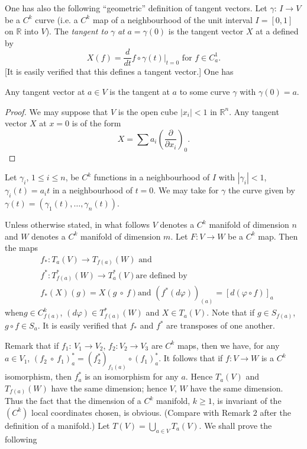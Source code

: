 One has also the following ``geometric'' definition of tangent
vectors. Let $\gamma$: $I \to V$ be a $C^k$ curve (i.e. a $C^k$ map of
a neighbourhood of the unit interval $I = [ 0, 1]$ on $\mathbb{R} $
into $V$). The \textit{tangent to} $\gamma$ \textit{at} $a = \gamma
(0)$ is the tangent vector $X$ at a defined by  
$$
X(f) = \frac{d}{dt} f \circ \gamma (t) \big |_{t = 0} \text {  for  }
f \in C^1_a. 
$$
[It is easily verified that this defines a tangent vector.] One has 

\begin{proposition}\label{chap2:sec1:prop4} %
  Any tangent vector at $a \in V$ is the tangent at $a$ to some curve
  $\gamma$ with $\gamma (0) = a$. 
\end{proposition}

\begin{proof}
  We may suppose that $V$ is the open cube $| x_i | < 1 $ in
  $\mathbb{R}^n$. Any tangent vector $X$ at $x = 0$ is of the form 
  $$
  X = \sum a_i \left(\frac{\partial}{\partial x_i}\right)_0.
  $$
\end{proof}

Let $\gamma_i$, $1 \le i \le n$, be $C^k$ functions in a neighbourhood
of $I$ with $| \gamma_i | < 1$, $\gamma_i (t) = a_i t$ in a
neighbourhood of $t = 0$. We may take for $\gamma$ the curve given by
$\gamma (t) = (\gamma_1(t) , \ldots , \gamma_n (t))$. 

Unless otherwise stated, in what follows $V$ denotes a $C^k$ manifold
of dimension $n$ and $W$ denotes a $C^k$ manifold of dimension
$m$. Let $F : V \to W$ be a $C^k$ map. Then the maps 
\begin{align*}
  & f_* : T_a (V) \to T_{f(a)} (W) \text { and }\\
  & f^* : T^*_{f(a)} (W)  \to T^*_a (V) \text {are defined by}\\
  & f_* (X) (g) = X(g ~  \circ ~ f) \text {and } (f^* (d \varphi))_{(a)} =
  [d(\varphi \circ f) ]_a 
\end{align*}
when\pageoriginale $g \in C^k_{f(a)}$, $(d \varphi) \in T^*_{f(a)} (W)$ and $X \in
T_a(V)$. Note that if $g \in S_{f(a)}$, $g \circ f \in S_a$. It is easily
verified that $f_*$ and $f^*$ are transposes of one another. 

Remark that if $f_1$: $V_1 \to V_2$, $f_2 : V_2 \to V_3$ are $C^k$
maps, then we have, for any $a \in V_1$, $(f_2 ~ \circ ~f_1)^*_a=
(f^*_2)_{f_1(a)} \circ (f_1)^*_a$. It follows that if $f: V \to W$ is a
$C^k$ isomorphism, then $f^*_a$ is an isomorphism for any $a$. Hence
$T_a (V)$ and $T_{f(a)}(W)$ have the same dimension; hence $V$, $W$
have the same dimension. Thus the fact that the dimension of a $C^k$
manifold, $k \ge 1$, is invariant of the $(C^k)$ local coordinates
chosen, is obvious. (Compare with Remark $2$ after the definition of a
manifold.) Let $T(V) = \bigcup\limits_{a \in V} T_a (V)$. We shall
prove the following  

